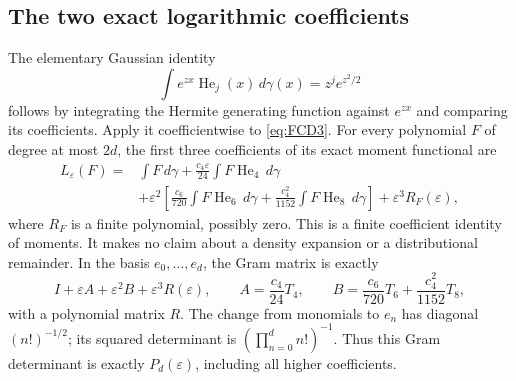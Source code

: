 \subsection{The two exact logarithmic coefficients}

The elementary Gaussian identity
\[
 \int e^{zx}\operatorname{He}_j(x)\,d\gamma(x)
       =z^j e^{z^2/2}
\]
follows by integrating the Hermite generating function against \(e^{zx}\)
and comparing its coefficients. Apply it coefficientwise to
\eqref{eq:FCD3}. For every polynomial \(F\) of degree at most \(2d\),
the first three coefficients of its exact moment functional are
\[
 \begin{split}
 L_\varepsilon(F)
 ={}&\int F\,d\gamma
       +\frac{c_4\varepsilon}{24}
                       \int F\operatorname{He}_4\,d\gamma\\
   &+\varepsilon^2\left[
        \frac{c_6}{720}\int F\operatorname{He}_6\,d\gamma
       +\frac{c_4^2}{1152}\int F\operatorname{He}_8\,d\gamma
                         \right]+\varepsilon^3 R_F(\varepsilon),
 \end{split}
\]
where \(R_F\) is a finite polynomial, possibly zero. This is a
finite coefficient identity of moments. It makes no claim about a
density expansion or a distributional remainder.
In the basis \(e_0,\ldots,e_d\), the Gram matrix is exactly
\[
 I+\varepsilon A+\varepsilon^2 B+\varepsilon^3 R(\varepsilon),
 \qquad
 A=\frac{c_4}{24}T_4,\qquad
 B=\frac{c_6}{720}T_6+\frac{c_4^2}{1152}T_8,
\]
with a polynomial matrix \(R\).
The change from monomials to \(e_n\) has diagonal
\((n!)^{-1/2}\); its squared determinant is
\((\prod_{n=0}^d n!)^{-1}\). Thus this Gram determinant is exactly
\(P_d(\varepsilon)\), including all higher coefficients.

